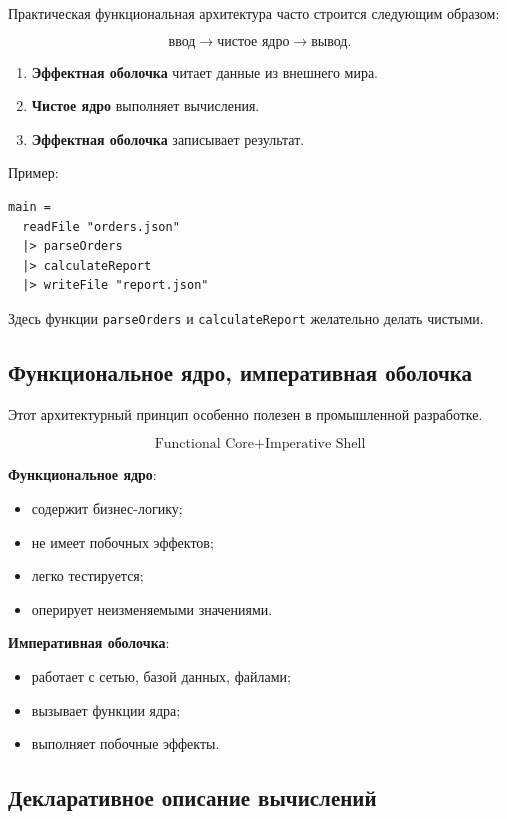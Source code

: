 \documentclass[12pt,a4paper]{article}
\begin{document}
Практическая функциональная архитектура часто строится следующим образом:

\[
\text{ввод} \to \text{чистое ядро} \to \text{вывод}.
\]

\begin{enumerate}
  \item \textbf{Эффектная оболочка} читает данные из внешнего мира.
  \item \textbf{Чистое ядро} выполняет вычисления.
  \item \textbf{Эффектная оболочка} записывает результат.
\end{enumerate}

Пример:

\begin{lstlisting}
main =
  readFile "orders.json"
  |> parseOrders
  |> calculateReport
  |> writeFile "report.json"
\end{lstlisting}

Здесь функции \texttt{parseOrders} и \texttt{calculateReport} желательно делать чистыми.

\subsection{Функциональное ядро, императивная оболочка}

Этот архитектурный принцип особенно полезен в промышленной разработке.

\[
\boxed{\text{Functional Core}} + \boxed{\text{Imperative Shell}}
\]

\textbf{Функциональное ядро}:
\begin{itemize}
  \item содержит бизнес-логику;
  \item не имеет побочных эффектов;
  \item легко тестируется;
  \item оперирует неизменяемыми значениями.
\end{itemize}

\textbf{Императивная оболочка}:
\begin{itemize}
  \item работает с сетью, базой данных, файлами;
  \item вызывает функции ядра;
  \item выполняет побочные эффекты.
\end{itemize}

\subsection{Декларативное описание вычислений}
\end{document}
